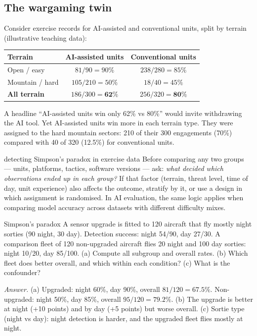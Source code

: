 \documentclass[11pt]{article}
\begin{document}
\subsection{The wargaming twin}
Consider exercise records for AI-assisted and conventional units, split by terrain (illustrative teaching data):
\begin{center}\renewcommand{\arraystretch}{1.3}
\begin{tabular}{lcc}\toprule Terrain & AI-assisted units & Conventional units\\\midrule
Open / easy & $81/90=90\%$ & $238/280=85\%$\\
Mountain / hard & $105/210=50\%$ & $18/40=45\%$\\\midrule
\textbf{All terrain} & $186/300=\mathbf{62\%}$ & $256/320=\mathbf{80\%}$\\\bottomrule\end{tabular}\end{center}
A headline ``AI-assisted units win only 62\% vs 80\%'' would invite withdrawing the AI tool. Yet AI-assisted units win more in each terrain type. They were assigned to the hard mountain sectors: 210 of their 300 engagements (70\%) compared with 40 of 320 (12.5\%) for conventional units.

\begin{defence}{detecting Simpson's paradox in exercise data}
Before comparing any two groups --- units, platforms, tactics, software versions --- ask: \emph{what decided which observations ended up in each group?} If that factor (terrain, threat level, time of day, unit experience) also affects the outcome, stratify by it, or use a design in which assignment is randomised. In AI evaluation, the same logic applies when comparing model accuracy across datasets with different difficulty mixes.
\end{defence}

\begin{question}{Simpson's paradox}
A sensor upgrade is fitted to 120 aircraft that fly mostly night sorties (90 night, 30 day). Detection success: night 54/90, day 27/30. A comparison fleet of 120 non-upgraded aircraft flies 20 night and 100 day sorties: night 10/20, day 85/100. (a) Compute all subgroup and overall rates. (b) Which fleet does better overall, and which within each condition? (c) What is the confounder?

\textit{Answer.} (a) Upgraded: night 60\%, day 90\%, overall $81/120=67.5\%$. Non-upgraded: night 50\%, day 85\%, overall $95/120=79.2\%$. (b) The upgrade is better at night (+10 points) and by day (+5 points) but worse overall. (c) Sortie type (night vs day): night detection is harder, and the upgraded fleet flies mostly at night.
\end{question}
\end{document}
